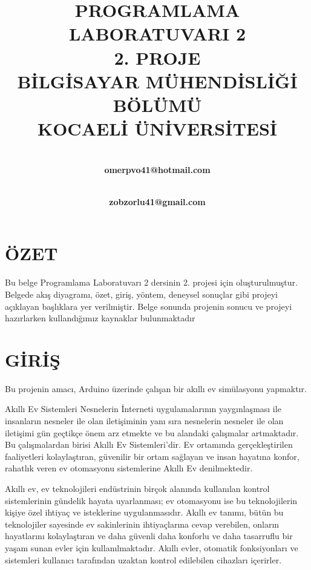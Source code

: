 \documentclass[conference]{IEEEtran}
\begin{document}
\title{PROGRAMLAMA LABORATUVARI 2\\
2. PROJE\\
BİLGİSAYAR MÜHENDİSLİĞİ BÖLÜMÜ\\
KOCAELİ ÜNİVERSİTESİ}

\author{
 \\
\textbf{omerpvo41@hotmail.com}
\and
{} \\
\textbf{zobzorlu41@gmail.com}
}

\maketitle

\section{ÖZET}
Bu belge Programlama Laboratuvarı 2 dersinin 2. projesi için
oluşturulmuştur. Belgede akış diyagramı, özet, giriş, yöntem, 
deneysel sonuçlar gibi projeyi açıklayan başlıklara yer verilmiştir. Belge sonunda projenin sonucu ve projeyi hazırlarken kullandığımız kaynaklar bulunmaktadır

\section{GİRİŞ}

Bu projenin amacı, Arduino üzerinde çalışan bir akıllı ev simülasyonu yapmaktır.

Akıllı Ev Sistemleri Nesnelerin İnterneti uygulamalarının yaygınlaşması ile insanların nesneler ile olan iletişiminin yanı sıra nesnelerin nesneler ile olan iletişimi gün geçtikçe önem arz etmekte ve bu alandaki çalışmalar artmaktadır. Bu çalışmalardan birisi Akıllı Ev Sistemleri’dir.
Ev ortamında gerçekleştirilen faaliyetleri kolaylaştıran, güvenilir bir ortam sağlayan ve insan hayatına konfor, rahatlık veren ev otomasyonu sistemlerine Akıllı Ev denilmektedir. 

Akıllı ev, ev teknolojileri endüstrinin birçok alanında kullanılan kontrol sistemlerinin gündelik hayata uyarlanması; ev otomasyonu ise bu teknolojilerin kişiye özel ihtiyaç ve isteklerine uygulanmasıdır. Akıllı ev tanımı, bütün bu teknolojiler sayesinde ev sakinlerinin ihtiyaçlarına cevap verebilen, onların hayatlarını kolaylaştıran ve daha güvenli daha konforlu ve daha tasarruflu bir yaşam sunan evler için kullanılmaktadır.
Akıllı evler, otomatik fonksiyonları ve sistemleri kullanıcı tarafından uzaktan kontrol edilebilen cihazları içerirler.
\end{document}
